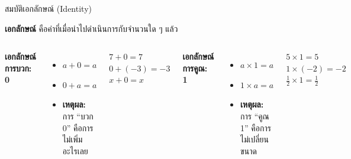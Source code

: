 \documentclass[11pt, aspectratio=169]{beamer}
\begin{document}
\begin{frame}{สมบัติเอกลักษณ์ (Identity)}
  \begin{explanation}
    \textbf{เอกลักษณ์} คือค่าที่เมื่อนำไปดำเนินการกับจำนวนใด ๆ แล้ว 
  \end{explanation}

  \begin{columns}[T]
      \textbf{เอกลักษณ์การบวก: 0}
      \begin{itemize}
        \item $a + 0 = a$
        \item $0 + a = a$
        \item \textbf{เหตุผล:} การ ``บวก 0'' คือการไม่เพิ่มอะไรเลย
      \end{itemize}

      \begin{exambox}[ตัวอย่าง]
        $7 + 0 = 7$ \\
        $0 + (-3) = -3$ \\
        $x + 0 = x$
      \end{exambox}

      \textbf{เอกลักษณ์การคูณ: 1}
      \begin{itemize}
        \item $a \times 1 = a$
        \item $1 \times a = a$
        \item \textbf{เหตุผล:} การ ``คูณ 1'' คือการไม่เปลี่ยนขนาด
      \end{itemize}

      \begin{exambox}[ตัวอย่าง]
        $5 \times 1 = 5$ \\
        $1 \times (-2) = -2$ \\
        $\frac{1}{2} \times 1 = \frac{1}{2}$
      \end{exambox}
  \end{columns}
\end{frame}
\end{document}
